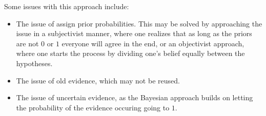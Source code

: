Some issues with this approach include:
\begin{itemize}
	\item The issue of assign prior probabilities. This may be solved by approaching the issue in a subjectivist manner, where one realizes that as long as the priors are not $0$ or $1$ everyone will agree in the end, or an objectivist approach, where one starts the process by dividing one's belief equally between the hypotheses.
	\item The issue of old evidence, which may not be reused.
	\item The issue of uncertain evidence, as the Bayesian approach builds on letting the probability of the evidence occuring going to $1$.
\end{itemize}